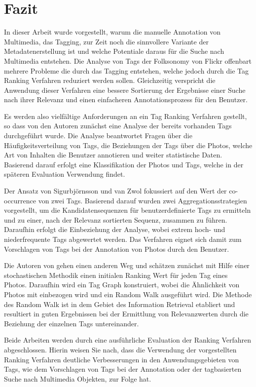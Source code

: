\section{Fazit}
In dieser Arbeit wurde vorgestellt, warum die manuelle Annotation von Multimedia, das Tagging, zur Zeit noch die sinnvollere Variante der Metadatenerstellung ist und welche Potentiale daraus für die Suche nach Multimedia entstehen. Die Analyse von Tags der Folksonomy von Flickr offenbart mehrere Probleme die durch das Tagging entstehen, welche jedoch durch die Tag Ranking Verfahren reduziert werden sollen. Gleichzeitig verspricht die Anwendung dieser Verfahren eine bessere Sortierung der Ergebnisse einer Suche nach ihrer Relevanz und einen einfacheren Annotationsprozess für den Benutzer. %

Es werden also vielfältige Anforderungen an ein Tag Ranking Verfahren gestellt, so dass von den Autoren zunächst eine Analyse der bereits vorhanden Tags durchgeführt wurde. Die Analyse beantwortet Fragen über die Häufigkeitsverteilung von Tags, die Beziehungen der Tags über die Photos, welche Art von Inhalten die Benutzer annotieren und weiter statistische Daten. Basierend darauf erfolgt eine Klassifikation der Photos und Tags, welche in der späteren Evaluation Verwendung findet.

Der Ansatz von Sigurbjörnsson und van Zwol fokussiert auf den Wert der co-occurrence von zwei Tags. Basierend darauf wurden zwei Aggregationsstrategien vorgestellt, um die Kandidatensequenzen für benutzerdefinierte Tags zu ermitteln und zu einer, nach der Relevanz sortierten Sequenz, zusammen zu führen. Daraufhin erfolgt die Einbeziehung der Analyse, wobei extrem hoch- und niederfrequente Tags abgewertet werden. Das Verfahren eignet sich damit zum Vorschlagen von Tags bei der Annotation von Photos durch den Benutzer.

Die Autoren von \cite{ranking} gehen einen anderen Weg und schätzen zunächst mit Hilfe einer stochastischen Methodik einen initialen Ranking Wert für jeden Tag eines Photos. Daraufhin wird ein Tag Graph konstruiert, wobei die Ähnlichkeit von Photos mit einbezogen wird und ein Random Walk ausgeführt wird. Die Methode des Random Walk ist in dem Gebiet des Information Retrieval etabliert und resultiert in guten Ergebnissen bei der Ermittlung von Relevanzwerten durch die Beziehung der einzelnen Tags untereinander.

Beide Arbeiten werden durch eine ausführliche Evaluation der Ranking Verfahren abgeschlossen. Hierin weisen Sie nach, dass die Verwendung der vorgestellten Ranking Verfahren deutliche Verbesserungen in den Anwendungsgebieten von Tags, wie dem Vorschlagen von Tags bei der Annotation oder der tagbasierten Suche nach Multimedia Objekten, zur Folge hat.